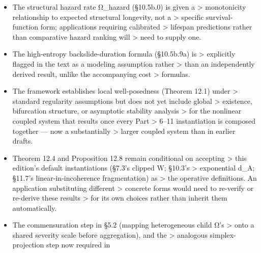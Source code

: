 \documentclass[
]{article}
\begin{document}
\begin{itemize}
  The correct claim is: the default landscape can support multiple
  locally stable configurations corresponding to distinct patterns of
  pairwise convergence/divergence among the three channels; the
  existence, number, and topology of its local minima, including whether
  they number exactly three, are determined by the chosen O\_o, O\_p,
  P\_m, D and require per-application verification, not a property
  guaranteed by Φ\textquotesingle s functional form on its own.
  Basins\textquotesingle{} precise depths, barrier heights, and
  bifurcation behavior as forcing varies continuously remain unresolved
  in closed form regardless, as before.
\item
  The structural hazard rate Ω\_hazard (§10.5b.0) is given a
  \textgreater{} monotonicity relationship to expected structural
  longevity, not a \textgreater{} specific survival-function form;
  applications requiring calibrated \textgreater{} lifespan predictions
  rather than comparative hazard ranking will \textgreater{} need to
  supply one.
\item
  The high-entropy backslide-duration formula (§10.5b.9a) is
  \textgreater{} explicitly flagged in the text as a modeling assumption
  rather \textgreater{} than an independently derived result, unlike the
  accompanying cost \textgreater{} formulas.
\item
  The framework establishes local well-posedness (Theorem 12.1) under
  \textgreater{} standard regularity assumptions but does not yet
  include global \textgreater{} existence, bifurcation structure, or
  asymptotic stability analysis \textgreater{} for the nonlinear coupled
  system that results once every Part \textgreater{} 6--11 instantiation
  is composed together --- now a substantially \textgreater{} larger
  coupled system than in earlier drafts.
\item
  Theorem 12.4 and Proposition 12.8 remain conditional on accepting
  \textgreater{} this edition's default instantiations (§7.3's clipped
  W; §10.3's \textgreater{} exponential d\_A; §11.7's
  linear-in-incoherence fragmentation) as \textgreater{} the operative
  definitions. An application substituting different \textgreater{}
  concrete forms would need to re-verify or re-derive these results
  \textgreater{} for its own choices rather than inherit them
  automatically.
\item
  The commensuration step in §5.2 (mapping heterogeneous child Ω's
  \textgreater{} onto a shared severity scale before aggregation), and
  the \textgreater{} analogous simplex-projection step now required in

\end{itemize}
\end{document}
